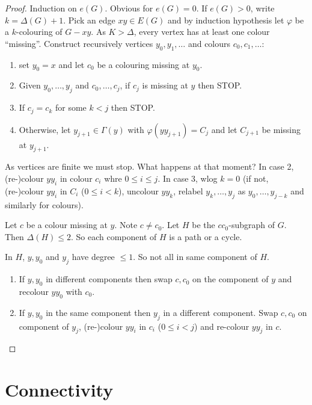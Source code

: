 \documentclass[a4paper]{article}
\begin{document}
\begin{proof}
  Induction on \(e(G)\). Obvious for \(e(G) = 0\). If \(e(G) > 0\), write \(k = \Delta(G) + 1\). Pick an edge \(xy \in E(G)\) and by induction hypothesis let \(\varphi\) be a \(k\)-colouring of \(G - xy\). As \(K > \Delta\), every vertex has at least one colour ``missing''. Construct recursively vertices \(y_0, y_1, \dots\) and colours \(c_0, c_1, \dots\):
  \begin{enumerate}
  \item set \(y_0 = x\) and let \(c_0\) be a colouring missing at \(y_0\).
  \item Given \(y_0, \dots, y_j\) and \(c_0, \dots, c_j\), if \(c_j\) is missing at \(y\) then STOP.
  \item If \(c_j = c_k\) for some \(k < j\) then STOP.
  \item Otherwise, let \(y_{j + 1} \in \Gamma(y)\) with \(\varphi(yy_{j + 1}) = C_j\) and let \(C_{j + 1}\) be missing at \(y_{j + 1}\).
  \end{enumerate}
  As vertices are finite we must stop. What happens at that moment? In case 2, (re-)colour \(yy_i\) in colour \(c_i\) whre \(0 \leq i \leq j\). In case 3, wlog \(k = 0\) (if not, (re-)colour \(yy_i\) in \(C_i\) (\(0 \leq i < k\)), uncolour \(yy_k\), relabel \(y_k, \dots, y_j\) as \(y_0, \dots, y_{j - k}\) and similarly for colours).

  Let \(c\) be a colour missing at \(y\). Note \(c \neq c_0\). Let \(H\) be the \(cc_0\)-subgraph of \(G\). Then \(\Delta(H) \leq 2\). So each component of \(H\) is a path or a cycle.

  In \(H\), \(y, y_0\) and \(y_j\) have degree \(\leq 1\). So not all in same component of \(H\).
  \begin{enumerate}
  \item If \(y, y_0\) in different components then swap \(c, c_0\) on the component of \(y\) and recolour \(yy_0\) with \(c_0\).
  \item If \(y, y_0\) in the same component then \(y_j\) in a different component. Swap \(c, c_0\) on component of \(y_j\), (re-)colour \(yy_i\) in \(c_i\) (\(0 \leq i < j\)) and re-colour \(yy_j\) in \(c\).
  \end{enumerate}
\end{proof}

\section{Connectivity}
\end{document}
